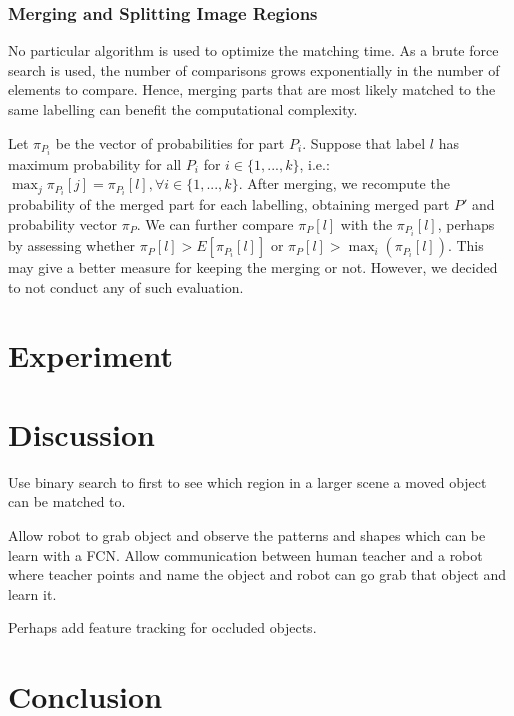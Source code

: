 \documentclass{article}
\begin{document}
\subsubsection{Merging and Splitting Image Regions}

No particular algorithm is used to optimize the matching time. As a brute force search is used, the number of comparisons grows exponentially in the number of elements to compare. Hence, merging parts that are most likely matched to the same labelling can benefit the computational complexity. 

Let $\pi_{P_i}$ be the vector of probabilities for part $P_i$. Suppose that label $l$ has maximum probability for all $P_i$ for $i\in \{1,...,k\}$, i.e.: $\max_j \pi_{P_i}[j] = \pi_{P_i}[l],  \forall i\in \{1,...,k\}$. After merging, we recompute the probability of the merged part for each labelling, obtaining merged part $P'$ and probability vector $\pi_P$. We can further compare $\pi_P[l]$ with the $\pi_{P_i}[l]$, perhaps by assessing whether $\pi_P[l] > E[\pi_{P_i}[l]]$ or $\pi_P[l] > \max_i (\pi_{P_i}[l])$. This may give a better measure for keeping the merging or not. However, we decided to not conduct any of such evaluation.

\section{Experiment}\label{sec:exp}


\section{Discussion}

Use binary search to first to see which region in a larger scene a moved object can be matched to.

Allow robot to grab object and observe the patterns and shapes which can be learn with a FCN. Allow communication between human teacher and a robot where teacher points and name the object and robot can go grab that object and learn it.  

Perhaps add feature tracking for occluded objects. 

\section{Conclusion}
\end{document}
